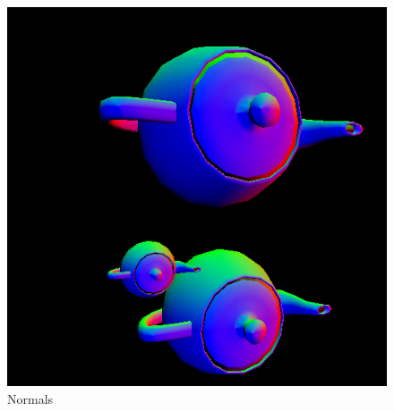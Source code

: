 \begin{center}
	\begin{figure}[here!]
		\includegraphics[width=\textwidth]{src/img/screenshots/normals.png}		\caption{Normals}
		\label{img:normals}
	\end{figure}
\end{center}